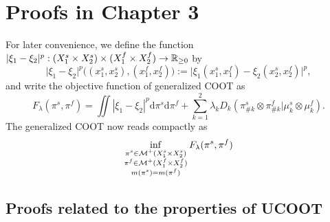 \section{Proofs in Chapter 3}

For later convenience, we define the function
$\vert \xi_1 - \xi_2 \vert^p: (X_1^s \times X_2^s) \times (X_1^f \times X_2^f) \to \mathbb R_{\geq 0}$ by
\begin{equation}
    \vert \xi_1 - \xi_2 \vert^p \big((x_1^s, x_2^s), (x_1^f, x_2^f)\big) :=
    \vert \xi_1(x_1^s, x_1^f) - \xi_2(x_2^s, x_2^f) \vert^p,
\end{equation}
and write the objective function of generalized COOT as
\begin{equation}
    F_{\lambda}(\pi^s, \pi^f) = \iint |\xi_1 - \xi_2|^p \mathrm d\pi^s \mathrm d \pi^f
    + \sum_{k=1}^2\lambda_k D_k(\pi^s_{\#k} \otimes \pi^f_{\#k} \vert \mu^s_k \otimes \mu^f_k).
\end{equation}
The generalized COOT now reads compactly as
\begin{equation} \label{eq:ucoot_copy}
  \inf_{\substack{\pi^s \in \mathcal M^+(X_1^s \times X_2^s) \\
  \pi^f \in \mathcal M^+(X_1^f \times X_2^f) \\ m(\pi^s) = m(\pi^f)}} F_{\lambda}(\pi^s, \pi^f)
\end{equation}

\subsection{Proofs related to the properties of UCOOT}

